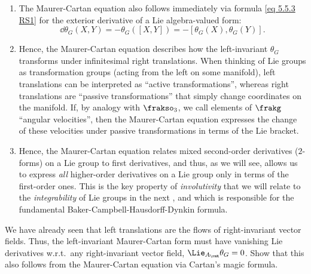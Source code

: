 \begin{rem}
\begin{enumerate}
        This is the Maurer-Cartan equation \eqref{eq 5.5.4 RS1 MC in coords} in a basis-free form. It is also equivalent to our original Maurer-Cartan equation \eqref{eq Maurer-Cartan left xi eta}, which is nothing but the pullback of this one along a map $g:[0,1]^2\to G$.
        \item The Maurer-Cartan equation also follows immediately via formula \eqref{eq 5.5.3 RS1} for the exterior derivative of a Lie algebra-valued form:
        \[\dd\theta_G(X,Y)=-\theta_G([X,Y])=-[\theta_G(X),\theta_G(Y)].\]
        \item Hence, the Maurer-Cartan equation describes how the left-invariant $\theta_G$ transforms under infinitesimal right translations. When thinking of Lie groups as transformation groups (acting from the left on some manifold), left translations can be interpreted as ``active transformations'', whereas right translations are ``passive transformations'' that simply change coordinates on the manifold. If, by analogy with $\frakso_3$, we call elements of $\frakg$ ``angular velocities'', then the Maurer-Cartan equation expresses the change of these velocities under passive transformations in terms of the Lie bracket.
        \item Hence, the Maurer-Cartan equation relates mixed second-order derivatives ($2$-forms) on a Lie group to first derivatives, and thus, as we will see, allows us to express \emph{all} higher-order derivatives on a Lie group only in terms of the first-order ones. This is the key property of \emph{involutivity} that we will relate to the \emph{integrability} of Lie groups in the next \sect, and which is responsible for the fundamental Baker-Campbell-Hausdorff-Dynkin formula.
    \end{enumerate}
\end{rem}

\begin{xca}
    We have already seen that left translations are the flows of right-invariant vector fields. Thus, the left-invariant Maurer-Cartan form must have vanishing Lie derivatives w.r.t.\ any right-invariant vector field, $\Lie_{A_\rmR}\theta_G=0$. Show that this also follows from the Maurer-Cartan equation via Cartan's magic formula.
\end{xca}


